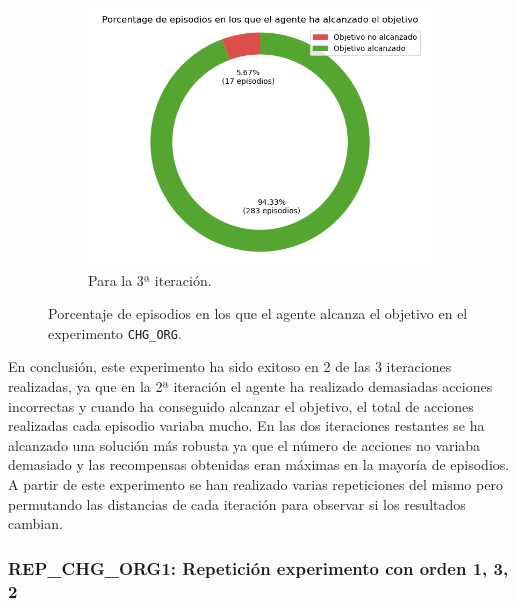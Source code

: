 \begin{figure}
\begin{subfigure}{.5\textwidth}
    \end{subfigure}
    \begin{subfigure}{.5\textwidth}
        \centering
        \includegraphics[scale=0.3]{cap5_experimentacion/images/CHANGE_ORIGIN-20-09_00-42-50_it3_porcentajeResuelto.png}
        \caption{Para la 3ª iteración.}
        \label{fig:chg_org_it3_porcentajeResuelto}
    \end{subfigure}%
    \caption{Porcentaje de episodios en los que el agente alcanza el objetivo en el experimento \texttt{CHG\_ORG}.}
    \label{fig:CHANGE_ORIGIN-20-09_00-42-50_porcentajeResuelto}
\end{figure}

En conclusión, este experimento ha sido exitoso en 2 de las 3 iteraciones realizadas, ya que en la 2ª iteración el agente ha realizado demasiadas acciones incorrectas y cuando ha conseguido alcanzar el objetivo, el total de acciones realizadas cada episodio variaba mucho. En las dos iteraciones restantes se ha alcanzado una solución más robusta ya que el número de acciones no variaba demasiado y las recompensas obtenidas eran máximas en la mayoría de episodios. \\ 
 
A partir de este experimento se han realizado varias repeticiones del mismo pero permutando las distancias de cada iteración para observar si los resultados cambian. 

\subsubsection{REP\_CHG\_ORG1: Repetición experimento con orden 1, 3, 2} \label{REP_CHG_ORG1}

